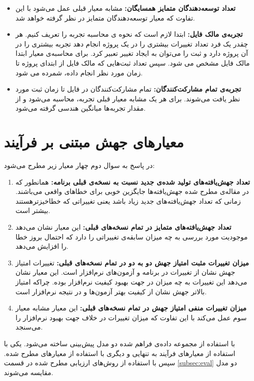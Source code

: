 \begin{itemize}
\item
\textbf{تعداد توسعه‌دهندگان متمایز همسایگان:}
مشابه معیار قبلی عمل می‌شود با این تفاوت که معیار توسعه‌دهندگان متمایز در نظر گرفته خواهد شد.
\item
\textbf{تجربه‌ی مالک فایل:}
 ابتدا لازم است که نحوه ی محاسبه تجربه را تعریف کنیم. هر چقدر یک فرد تعداد تغییرات بیشتری را در یک پروژه انجام دهد تجربه بیشتری را در آن پروژه دارد و ثبت را می‌توان به ایجاد تغییر تعبیر کرد. برای محاسبه‌ی معیار ابتدا مالک فایل مشخص می شود. سپس تعداد ثبت‌هایی که مالک فایل از ابتدای پروژه تا زمان مورد نظر انجام داده، شمرده می شود.
\item
\textbf{تجربه‌ی تمام مشارکت‌کنندگان:}
تمام مشارکت‌کنندگان در فایل تا زمان ثبت مورد نظر یافت می‌شوند. برای هر یک مشابه معیار قبلی تجربه، محاسبه می‌شود و از مقدار تجربه‌ها میانگین هندسی گرفته می‌شود. 

\end{itemize}


\section{معیارهای جهش مبتنی بر فرآیند}
در پاسخ به سوال دوم چهار معیار زیر مطرح می‌شود:
\begin{enumerate}
	
	\item  
	\textbf{
		تعداد جهش‌یافته‌های تولید شده‌ی جدید نسبت به نسخه‌ی قبلی برنامه: }همانطور که در مقاله‌ی \cite{just2014mutants} مطرح شده جهش‌یافته‌ها جایگزین خوبی برای خطاهای واقعی می‌باشند. زمانی که تعداد جهش‌یافته‌های جدید زیاد باشد یعنی تغییراتی که خطا‌خیز‌ترهستند بیشتر است. 
	\item 
	\textbf{
		تعداد جهش‌یافته‌های متمایز در تمام نسخه‌های قبلی:} این معیار نشان می‌دهد موجودیت مورد بررسی به چه میزان سابقه‌ی تغییراتی را دارد که احتمال بروز خطا را افزایش می‌دهد.
	
	\item 
	\textbf{
		میزان تغییرات مثبت امتیاز جهش دو به دو در تمام نسخه‌های قبلی:}
	تغییرات امتیاز جهش نشان از تغییرات در برنامه و آزمون‌های نرم‌افزار است.     این معیار نشان می‌دهد این تغییرات به چه میزان در جهت بهبود کیفیت نرم‌افزار بوده. چراکه امتیاز بالاتر جهش نشان از کیفیت بهتر آزمون‌ها و در نتیجه نرم‌افزار است. 
	\item 
	\textbf{
		میزان تغییرات منفی امتیاز جهش در تمام نسخه‌های قبلی:}
	این معیار مشابه معیار سوم عمل می‌کند با این تفاوت که میزان تغییرات در خلاف جهت بهبود نرم‌افزار را می‌سنجد. 	
	
\end{enumerate}
با استفاده از مجموعه داده‌ی فراهم شده دو مدل پیش‌بینی ساخته می‌شود. یکی با استفاده از معیارهای فرآیند به تنهایی و دیگری با استفاده از معیارهای مطرح شده. سپس با استفاده از روش‌های ارزیابی مطرح شده در قسمت \ref{subsec:eval}  دو مدل مقایسه می‌شوند.\\

